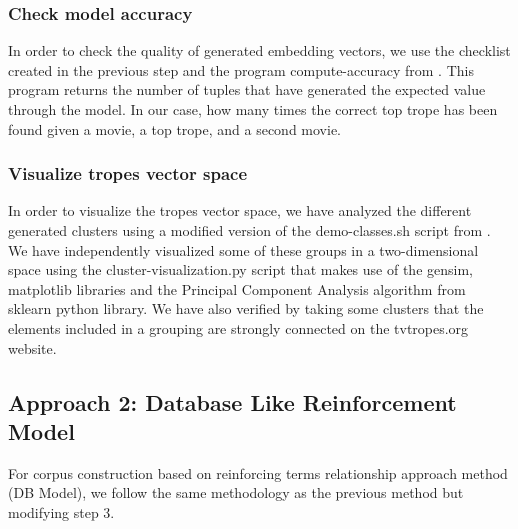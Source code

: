 \documentclass[letterpaper]{article}
\begin{document}
\subsubsection{Check model accuracy}
In order to check the quality of generated embedding vectors, we use the checklist created in the previous step and the program compute-accuracy from \cite{git-hub-word2vec}. This program returns the number of tuples that have generated the expected value through the model. In our case, how many times the correct top trope has been found given a movie, a top trope, and a second movie.

\subsubsection{Visualize tropes vector space}
In order to visualize the tropes vector space, we have analyzed the different generated clusters using a modified version of the demo-classes.sh script from \cite{git-hub-word2vec}. 
We have independently visualized some of these groups in a two-dimensional space using the cluster-visualization.py script that makes use of the gensim, matplotlib libraries and the Principal Component Analysis algorithm from sklearn python library. We have also verified by taking some clusters that the elements included in a grouping are strongly connected on the tvtropes.org website.

\subsection{Approach 2: Database Like Reinforcement Model}
For corpus construction based on reinforcing terms relationship approach method (DB Model), we follow the same methodology as the previous method but modifying step 3.
	
	
	
\end{document}
